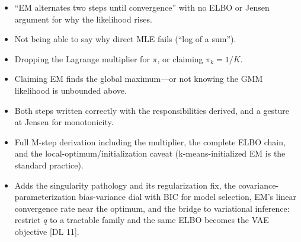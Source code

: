 \begin{interviewq}
\redflags
\begin{itemize}
    \item ``EM alternates two steps until convergence'' with no ELBO or Jensen argument for why the likelihood rises.
    \item Not being able to say why direct MLE fails (``log of a sum'').
    \item Dropping the Lagrange multiplier for $\pi$, or claiming $\pi_k = 1/K$.
    \item Claiming EM finds the global maximum---or not knowing the GMM likelihood is unbounded above.
\end{itemize}


\goodgreat
\begin{itemize}
    \item {} Both steps written correctly with the responsibilities derived, and a gesture at Jensen for monotonicity.
    \item {} Full M-step derivation including the multiplier, the complete ELBO chain, and the local-optimum/initialization caveat (k-means-initialized EM is the standard practice).
    \item {} Adds the singularity pathology and its regularization fix, the covariance-parameterization bias-variance dial with BIC for model selection, EM's linear convergence rate near the optimum, and the bridge to variational inference: restrict $q$ to a tractable family and the same ELBO becomes the VAE objective [DL 11].
\end{itemize}

\end{interviewq}

